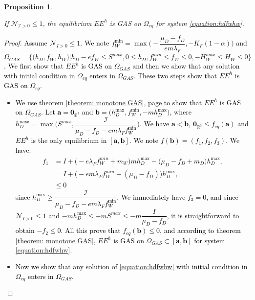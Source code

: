 \documentclass{article}
\newcommand{\lfw}{\lambda_{F}}
\newcommand{\lfw}{\lambda_{F}}
\newcommand{\cI}{\mathcal{I}}
\newcommand{\R}{\mathbb{R}}
\newcommand{\N}{\mathcal{N}}
\newcommand{\vdeux}[1]{\textcolor{black}{#1}}
\newcommand{\vtrois}[1]{\textcolor{black}{#1}}
\newtheorem{prop}[theorem]{Proposition}
\theoremstyle{definition}
\theoremstyle{remark}
\begin{document}





\begin{prop}\label{prop:EEHGAS}

If $\mathcal{N}_{\cI > 0} \leq 1$, the equilibrium $EE^{h}$ is GAS on $\Omega_{eq}$ for system \eqref{equation:hdfwhw}.
\end{prop}


\begin{proof}
\vdeux{
Assume $\N_{I> 0} \leq 1$.
We note $f_W^{\min} = \max\Big(-\dfrac{\mu_D - f_D}{e m \lfw}, -K_F(1-\alpha)\Big)$ and $\Omega_{GAS}=\Big\{\Big(h_D, f_W, h_W \Big)  \Big|h_D - ef_W \leq S^{max}, 0 \leq h_D,  f_W^{min} \leq f_W \leq 0, -H_W^{max}\leq  H_W \leq 0 \Big\}$. We first show that $EE^{h}$ is GAS on $\Omega_{GAS}$ and then we show that any solution with initial condition in $\Omega_{eq}$ enters in $ \Omega_{GAS}$. These two steps show that $EE^{h}$ is GAS on $\Omega_{eq}$.}
\begin{itemize}
\item \vdeux{ We use theorem \ref{theorem: monotone GAS}, page \pageref{theorem: monotone GAS} to show that $EE^{h}$ is GAS on $\Omega_{GAS}$. Let $\mathbf{a} = \mathbf{0}_{\R^3}$ and $\mathbf{b} = \Big(h_D^{\max}, f_W^{\min}, -mh_D^{\max} \Big)$, where $h_D^{max} = \max\Big(S^{max}, \dfrac{\cI}{\mu_D - f_D - e m \lfw f^{\min}_W}\Big)$. We have $\mathbf{a} < \mathbf{b}$, $\mathbf{0}_{\R^3} \leq f_{eq}(\mathbf{a})$ and $EE^{h}$ is the only equilibrium in $[\mathbf{a}, \mathbf{b}]$. We note $f(\mathbf{b}) = (f_1, f_2, f_3)$. We have:
\begin{align*}
f_1 &= I + \Big(-e\lfw f_W^{min} + m_W\Big)mh_D^{\max} - \Big(\mu_D - f_D + m_D\Big) h_D^{\max}, \\
&= I + \Big(-e m \lfw f_W^{min} - (\mu_D - f_D) \Big)h_D^{\max}, \\
& \leq 0
\end{align*}
since $h_D^{\max} \geq \dfrac{\cI}{\mu_D - f_D - e m \lfw f^{\min}_W}$. We immediately have $f_3 = 0$, and since $\N_{I>0} \leq 1$ and $-m h_D^{\max} \leq -mS^{max} \leq -m\dfrac{I}{\mu_D -f_D}$, it is straightforward to obtain $-f_2 \leq 0$. All this prove that $f_{eq}(\mathbf{b}) \leq 0$, and according to theorem \ref{theorem: monotone GAS}, $EE^{h}$ is GAS on $ \Omega_{GAS} \subset [\mathbf{a}, \mathbf{b}]$ for system \eqref{equation:hdfwhw}.}
\item \vtrois{ Now we show that any solution of \eqref{equation:hdfwhw} with initial condition in $\Omega_{eq}$ enters in $\Omega_{GAS}$. 
}
\end{itemize}
\end{proof}
\end{document}
